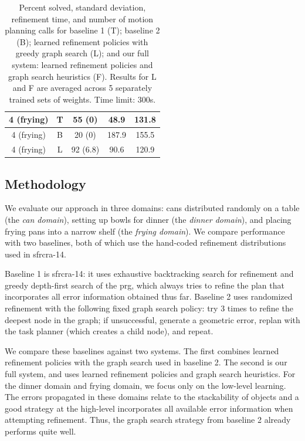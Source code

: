 \begin{table}[t]
{\begin{tabular}{ccccc}
    \midrule[1.5pt]
      4 (frying) & T & 55 (0) & 48.9 & 131.8\\
    \midrule
      4 (frying) & B & 20 (0) & 187.9 & 155.5\\
    \midrule
      4 (frying) & L & 92 (6.8) & 90.6 & 120.9\\
    \bottomrule[1.5pt]
  \end{tabular}}
  \caption{\small{Percent solved, standard deviation, refinement time,
      and number of motion planning calls for baseline 1 (T); baseline 2
      (B); learned refinement policies with greedy graph search (L);
      and our full system: learned refinement policies and graph
      search heuristics (F). Results for L and F are averaged across 5
      separately trained sets of weights. Time limit: 300s.}}
  \label{table:results}
\end{table}

\subsection{Methodology}
We evaluate our approach in three domains: cans distributed randomly
on a table (the \emph{can domain}), setting up bowls for dinner (the
\emph{dinner domain}), and placing frying pans into a narrow shelf
(the \emph{frying domain}).  We compare performance with two
baselines, both of which use the hand-coded refinement distributions
used in {\sc sfrcra-14}.

Baseline 1 is {\sc sfrcra-14}: it uses exhaustive backtracking search
for refinement and greedy depth-first search of the {\sc prg}, which
always tries to refine the plan that incorporates all error
information obtained thus far.  Baseline 2 uses randomized refinement
with the following fixed graph search policy: try 3 times to refine
the deepest node in the graph; if unsuccessful, generate a geometric
error, replan with the task planner (which creates a child node), and
repeat.

We compare these baselines against two systems. The first combines
learned refinement policies with the graph search used in baseline
2. The second is our full system, and uses learned refinement policies
and graph search heuristics.  For the dinner domain and frying domain,
we focus only on the low-level learning. The errors propagated in these
domains relate to the stackability of objects and a good strategy at
the high-level incorporates all available error information when
attempting refinement. Thus, the graph search strategy from baseline 2
already performs quite well.

